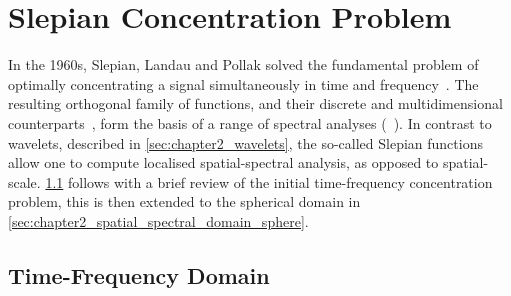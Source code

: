 



\section{Slepian Concentration Problem}\label{sec:chapter2_slepian_concentration_problem}

In the 1960s, Slepian, Landau and Pollak solved the fundamental problem of optimally concentrating a signal simultaneously in time and frequency~\cite{Landau1961,Landau1962,Slepian1983,Slepian1961}.
The resulting orthogonal family of functions, and their discrete and multidimensional counterparts~\cite{Bronez1988,Hanssen1997,Liu1992,Slepian1964,Slepian1978}, form the basis of a range of spectral analyses (\eg{}~\cite{Thomson1982,Thomson1990}).
In contrast to wavelets, described in \cref{sec:chapter2_wavelets}, the so-called Slepian functions allow one to compute localised spatial-spectral analysis, as opposed to spatial-scale.
\cref{sec:chapter2_time_frequency_domain} follows with a brief review of the initial time-frequency concentration problem, this is then extended to the spherical domain in \cref{sec:chapter2_spatial_spectral_domain_sphere}.

\subsection{Time-Frequency Domain}\label{sec:chapter2_time_frequency_domain}

